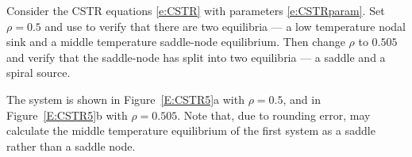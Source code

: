 \documentclass{ximera}
\begin{document}
\begin{computerExercise}  \label{E:CSTR5}
Consider the CSTR equations \eqref{e:CSTR} with parameters 
\eqref{e:CSTRparam}. Set $\rho=0.5$ and use 
{\pplane} to verify 
that there are two equilibria --- a low temperature nodal sink 
and a middle temperature saddle-node equilibrium.  Then change 
$\rho$ to $0.505$ and verify that the saddle-node has split 
into two equilibria --- a saddle and a spiral source.

\begin{solution}

The system is shown in Figure~\ref{E:CSTR5}a with $\rho = 0.5$, and in
Figure~\ref{E:CSTR5}b with $\rho = 0.505$.  Note that, due to rounding
error, {\pplane} may calculate the middle temperature equilibrium of
the first system as a saddle rather than a saddle node.  

\begin{figure}[htb]
                       \centerline{%
                       }
\end{figure}

\end{solution}
\end{computerExercise}
\end{document}
